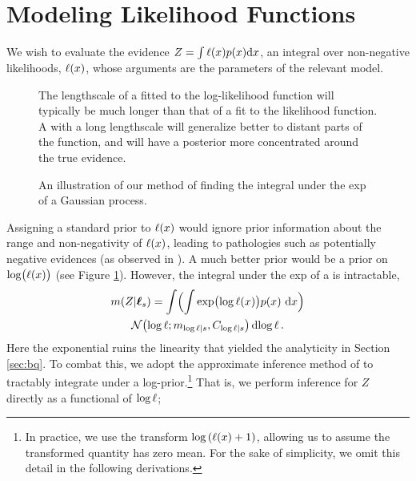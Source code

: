\documentclass{article}
\begin{document}
\section{Modeling Likelihood Functions}\label{sec:model_lik}

We wish to evaluate the evidence $Z = \int \lfn(\lfv) p(\lfv) \ud\lfv$, an integral over non-negative likelihoods, $\lfn(\lfv)$, whose arguments are the parameters of the relevant model.
%
 \begin{figure}
 \centering
 \caption{The lengthscale of a \gpb fitted to the log-likelihood function will typically be much longer than that of a \gpb fit to the likelihood function.  A \gpb with a long lengthscale will generalize better to distant parts of the function, and will have a posterior more concentrated around the true evidence. }
 \label{fig:log_is_better}
 \end{figure}
%
\begin{figure}
\centering
{}
\caption{An illustration of our method of finding the integral under the exp of a Gaussian process.}
\label{fig:delta}
\end{figure}
%
Assigning a standard \gpb prior to $\lfn(\lfv)$ would ignore prior information about the range and non-negativity of $\lfn(\lfv)$, leading to pathologies such as potentially negative evidences (as observed in \citet{BZMonteCarlo}).  A much better prior would be a \gpb prior on $\log\bigl(\lfn(x)\bigr)$ (see Figure \ref{fig:log_is_better}). However, the integral under the exp of a \gpb is intractable,
% 
\begin{multline}\label{eq:minty_l}
\mean{\If}{\vr_s}
 =\int \Bigl( \int \exp\bigl(\tr(\lfv)\bigr)\po{\lfv}\,\ud\lfv\Bigr)\\
\N{\tr}{\meancondfn{\tr}{s}}{C_{\tr|s}} \ud \tr\,.
\end{multline}
%
Here the exponential ruins the linearity that yielded the analyticity in Section \ref{sec:bq}. To combat this, we adopt the approximate inference method of \citep{BQR} to tractably integrate under a log-\gpb prior.\footnote{In practice, we use the transform 
$\log\left(\lfn(\lfv) + 1\right)$, allowing us to assume the transformed quantity has zero mean. For the sake of simplicity, we omit this detail in the following derivations.} That is, we perform inference for $Z$ directly as a functional of $\tr$;
\end{document}

